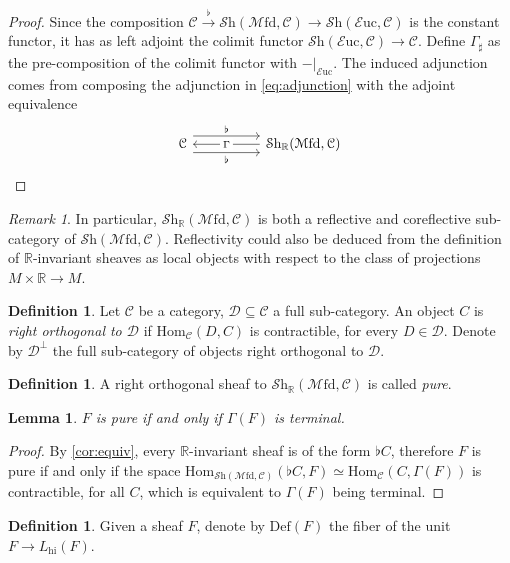 \documentclass[a4paper]{book}
\newcommand{\lC}{\mathcal{C}}
\newcommand{\lD}{\mathcal{D}}
\newcommand{\lE}{\mathcal{E}}
\newcommand{\lM}{\mathcal{M}}
\newcommand{\bR}{\mathbb{R}}
\newcommand{\lS}{\mathcal{S}}
\newcommand{\Shv}{\lS\mathrm{h}} %
\newcommand{\hi}{\mathrm{hi}}
\renewcommand{\hom}{\mathrm{Hom}} %
\newcommand{\Euc}{\lE\mathrm{uc}} %
\newcommand{\Mfd}{\lM\mathrm{fd}} %
\newtheorem{lemma}[equation]{Lemma}
\theoremstyle{definition}
\newtheorem{definition}[equation]{Definition}
\theoremstyle{remark}
\newtheorem{remark}[equation]{Remark}
\numberwithin{equation}{section}
\begin{document}
\begin{proof}
  Since the composition $\lC\xrightarrow{\flat}\Shv(\Mfd,\lC)\to\Shv(\Euc,\lC)$ is the constant functor, it has as left adjoint the colimit functor $\Shv(\Euc,\lC)\to\lC$. Define $\Gamma_\sharp$ as the pre-composition of the colimit functor with $-|_{\Euc}$. The induced adjunction comes from composing the adjunction in \cref{eq:adjunction} with the adjoint equivalence \begin{equation}
    \begin{tikzcd}
      \lC \arrow[rr,shift left=2.5,"\flat"] \arrow[rr,shift right=2.5,"\flat"'] & & \Shv_\bR(\Mfd,\lC) \arrow[ll,"\Gamma" description]
    \end{tikzcd}
  \end{equation}
\end{proof}
\begin{remark}
  In particular, $\Shv_\bR(\Mfd,\lC)$ is both a reflective and coreflective sub-category of $\Shv(\Mfd,\lC)$. Reflectivity could also be deduced from the definition of $\bR$-invariant sheaves as local objects with respect to the class of projections $M\times\bR\to M$. 
\end{remark}
\begin{definition}
  Let $\lC$ be a category, $\lD\subseteq\lC$ a full sub-category. An object $C$ is \emph{right orthogonal to $\lD$} if $\hom_\lC(D,C)$ is contractible, for every $D\in\lD$. Denote by $\lD^\perp$ the full sub-category of objects right orthogonal to $\lD$. 
\end{definition}
\begin{definition}
  A right orthogonal sheaf to $\Shv_\bR(\Mfd,\lC)$ is called \emph{pure}.
\end{definition}
\begin{lemma}
  $F$ is pure if and only if $\Gamma(F)$ is terminal. 
\end{lemma}
\begin{proof}
  By \cref{cor:equiv}, every $\bR$-invariant sheaf is of the form $\flat C$, therefore $F$ is pure if and only if the space $\hom_{\Shv(\Mfd,\lC)}(\flat C,F)\simeq\hom_{\lC}(C,\Gamma(F))$ is contractible, for all $C$, which is equivalent to $\Gamma(F)$ being terminal. 
\end{proof}
\begin{definition}
  Given a sheaf $F$, denote by $\mathrm{Def}(F)$ the fiber of the unit $F\to L_\hi(F)$. 
\end{definition}
  
\end{document}
